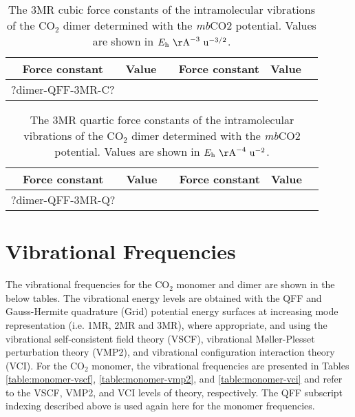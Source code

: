 \documentclass[aip,jcp,showpacs,superscriptaddress,groupedaddress]{revtex4-1}  %
\begin{document}
\begin{table}[]
\centering
\caption{The 3MR cubic force constants of the intramolecular vibrations of the CO$_2$ dimer determined with the \emph{mb}CO2 potential. Values are shown in $E_{\rm h}\ {\rm \AA}^{-3}\ {\rm u}^{-3/2}$.}
\label{table:qff_dimer-3mr-c}
\begin{ruledtabular}
\begin{tabular}{cccccc}
Force constant & Value      &  & Force constant & Value      &    \\
\hline \Tstrut
?dimer-QFF-3MR-C?
\end{tabular}
\end{ruledtabular}
\end{table}

\begin{table}[H]
\centering
\caption{The 3MR quartic force constants of the intramolecular vibrations of the CO$_2$ dimer determined with the \emph{mb}CO2 potential. Values are shown in $E_{\rm h}\ {\rm \AA}^{-4}\ {\rm u}^{-2}$.}
\label{table:qff_dimer-3mr-q}
\begin{ruledtabular}
\begin{tabular}{cccccc}
Force constant & Value      &  & Force constant & Value      &    \\
\hline \Tstrut
?dimer-QFF-3MR-Q?
\end{tabular}
\end{ruledtabular}
\end{table}

\section[S2]{\label{sec:vibrations}Vibrational Frequencies}
The vibrational frequencies for the CO$_2$ monomer and dimer are shown in the below tables. The vibrational energy levels are obtained with the QFF and Gauss-Hermite quadrature (Grid) potential energy surfaces at increasing mode representation (i.e. 1MR, 2MR and 3MR), where appropriate, and using the vibrational self-consistent field theory (VSCF), vibrational M{\o}ller-Plesset perturbation theory (VMP2), and vibrational configuration interaction theory (VCI). For the CO$_2$ monomer, the vibrational frequencies are presented in Tables \ref{table:monomer-vscf}, \ref{table:monomer-vmp2}, and \ref{table:monomer-vci} and refer to the VSCF, VMP2, and VCI levels of theory, respectively. The QFF subscript indexing described above is used again here for the monomer frequencies. 
\end{document}
